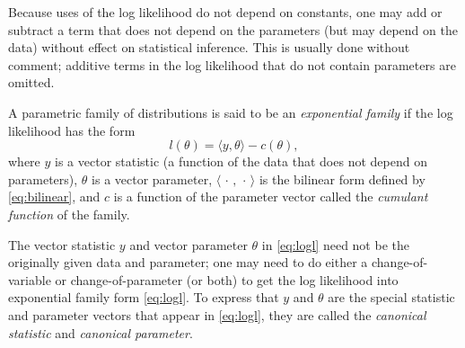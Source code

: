 \documentclass[11pt]{article}
\newcommand{\inner}[1]{\langle #1 \rangle}
\newcommand{\fatdot}{\,\cdot\,}
\begin{document}
Because uses of the
log likelihood do not depend on constants, one may add or subtract a term
that does not depend on the parameters (but may depend on the data) without
effect on statistical inference.  This is usually done without comment;
additive terms in the log likelihood that do not contain parameters are
omitted.

A parametric family of distributions is said to be an \emph{exponential family}
if the log likelihood has the form
\begin{equation} \label{eq:logl}
   l(\theta) = \inner{y, \theta} - c(\theta),
\end{equation}
where $y$ is a vector statistic (a function of the data that does not depend
on parameters), $\theta$ is a vector parameter, $\inner{\fatdot, \fatdot}$ is
the bilinear form defined by \eqref{eq:bilinear}, and $c$ is a function of
the parameter vector called the \emph{cumulant function} of the family.

The vector statistic $y$ and vector parameter $\theta$ in \eqref{eq:logl}
need not be the originally given data and parameter; one may need to
do either a change-of-variable or change-of-parameter (or both) to get the
log likelihood into exponential family form \eqref{eq:logl}.  To express
that $y$ and $\theta$ are the special statistic and parameter vectors that
appear in \eqref{eq:logl}, they are called the \emph{canonical statistic}
and \emph{canonical parameter}.
\end{document}
